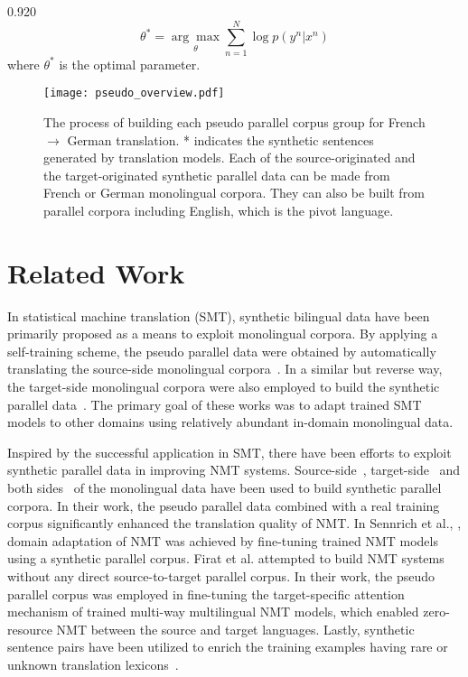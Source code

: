 \documentclass[11pt,letterpaper]{article}
\newcommand{\mylinespacing}{0.920}
\begin{document}
\begin{spacing}{\mylinespacing}
\begin{equation}
\theta^* = \underset{\theta}{\arg\!\max} \sum_{n=1}^{N} \log p(y^{n}|x^{n})
\end{equation}
where \(\theta^*\) is the optimal parameter.

\begin{figure*}[t]
	\centering
	\texttt{[image: pseudo\_overview.pdf]}
    \caption{The process of building each pseudo parallel corpus group for French  \(\rightarrow\) German translation. * indicates the synthetic sentences generated by translation models. Each of the source-originated and the target-originated synthetic parallel data can be made from French or German monolingual corpora. They can also be built from parallel corpora including English, which is the pivot language.}
	\label{fig:pseudo_overview}
\end{figure*}

\section{Related Work}
In statistical machine translation (SMT), synthetic bilingual data have been primarily proposed as a means to exploit monolingual corpora. By applying a self-training scheme, the pseudo parallel data were obtained by automatically translating the source-side monolingual corpora~\cite{ueffing2007transductive,wu2008domain}. In a similar but reverse way, the target-side monolingual corpora were also employed to build the synthetic parallel data~\cite{bertoldi2009domain,lambert2011investigations}. The primary goal of these works was to adapt trained SMT models to other domains using relatively abundant in-domain monolingual data.

Inspired by the successful application in SMT, there have been efforts to exploit synthetic parallel data in improving NMT systems. Source-side~\cite{zhang2016exploiting}, target-side~\cite{sennrich2015improving} and both sides~\cite{cheng2016semi} of the monolingual data have been used to build synthetic parallel corpora. In their work, the pseudo parallel data combined with a real training corpus significantly enhanced the translation quality of NMT. In Sennrich et al., , domain adaptation of NMT was achieved by fine-tuning trained NMT models using a synthetic parallel corpus. Firat et al.  attempted to build NMT systems without any direct source-to-target parallel corpus. In their work, the pseudo parallel corpus was employed in fine-tuning the target-specific attention mechanism of trained multi-way multilingual NMT \cite{firat2016multi} models, which enabled zero-resource NMT between the source and target languages. Lastly, synthetic sentence pairs have been utilized to enrich the training examples having rare or unknown translation lexicons~\cite{zhang2016bridging}.


\end{spacing}
\end{document}
